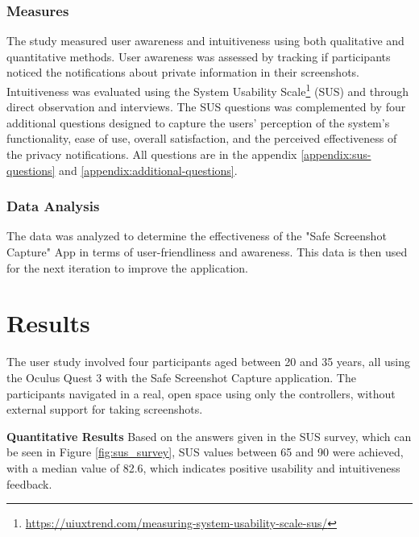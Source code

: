 \documentclass[sigconf,authordraft]{acmart}
\begin{document}
\subsubsection{Measures}
The study measured user awareness and intuitiveness using both qualitative and quantitative methods. User awareness was assessed by tracking if participants noticed the notifications about private information in their screenshots. Intuitiveness was evaluated using the System Usability Scale\footnote{\url{https://uiuxtrend.com/measuring-system-usability-scale-sus/}} (SUS) and through direct observation and interviews. The SUS questions was complemented by four additional questions designed to capture the users' perception of the system's functionality, ease of use, overall satisfaction, and the perceived effectiveness of the privacy notifications. All questions are in the appendix \ref{appendix:sus-questions} and \ref{appendix:additional-questions}.

\subsubsection{Data Analysis}
The data was analyzed to determine the effectiveness of the "Safe Screenshot Capture" App in terms of user-friendliness and awareness. This data is then used for the next iteration to improve the application.

\section{Results}

The user study involved four participants aged between 20 and 35 years, all using the Oculus Quest 3 with the Safe Screenshot Capture application. The participants navigated in a real, open space using only the controllers, without external support for taking screenshots.

\textbf{Quantitative Results}
Based on the answers given in the SUS survey, which can be seen in Figure \ref{fig:sus_survey}, SUS values between 65 and 90 were achieved, with a median value of 82.6, which indicates positive usability and intuitiveness feedback.
\end{document}
